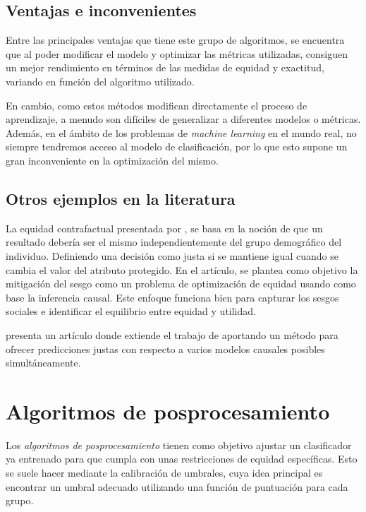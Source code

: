 \documentclass[oneside,openright,titlepage,numbers=noenddot,openany,headinclude,footinclude=true,
cleardoublepage=empty,abstractoff,BCOR=5mm,paper=a4,fontsize=12pt,main=spanish]{scrreprt}
\begin{document}
\subsection*{Ventajas e inconvenientes}

Entre las principales ventajas que tiene este grupo de algoritmos, se encuentra que al poder modificar el modelo y optimizar las métricas utilizadas, consiguen un mejor rendimiento en términos de las medidas de equidad y exactitud, variando en función del algoritmo utilizado.

En cambio, como estos métodos modifican directamente el proceso de aprendizaje, a menudo son difíciles de generalizar a diferentes modelos o métricas. Además, en el ámbito de los problemas de \textit{machine learning} en el mundo real, no siempre tendremos acceso al modelo de clasificación, por lo que esto supone un gran inconveniente en la optimización del mismo.

\clearpage

\subsection*{Otros ejemplos en la literatura}

La equidad contrafactual presentada por \cite{counterfactual2018}, se basa en la noción de que un resultado debería ser el mismo independientemente del grupo demográfico del individuo. Definiendo una decisión como justa si se mantiene igual cuando se cambia el valor del atributo protegido. En el artículo, se plantea como objetivo la mitigación del sesgo como un problema de optimización de equidad usando como base la inferencia causal. Este enfoque funciona bien para capturar los sesgos sociales e identificar el equilibrio entre equidad y utilidad. 

\cite{worlds2017} presenta un artículo donde extiende el trabajo de \cite{counterfactual2018} aportando un método para ofrecer predicciones justas con respecto a varios modelos causales posibles simultáneamente.

\section{Algoritmos de posprocesamiento}

Los \textit{algoritmos de posprocesamiento} tienen como objetivo ajustar un clasificador ya entrenado para que cumpla con unas restricciones de equidad específicas. Esto se suele hacer mediante la calibración de umbrales, cuya idea principal es encontrar un umbral adecuado utilizando una función de puntuación para cada grupo.
\end{document}
